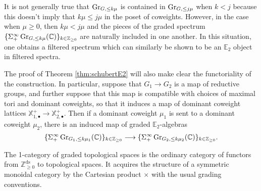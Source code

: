 \begin{rmk}
It is not generally true that $\operatorname{\mathrm{Gr}}_{G,\leq k\mu}$ is contained in $\operatorname{\mathrm{Gr}}_{G, \leq j\mu}$ when $k<j$ because this doesn't imply that $k\mu \leq j\mu$ in the poset of coweights.  However, in the case when $\mu \geq 0$, then $k\mu < j\mu$ and the pieces of the graded spectrum $ \{ \Sigma^{\infty}_+ \operatorname{\mathrm{Gr}}_{G,\leq k\mu}(\mathbb{C})\}_{k\in \mathbb{Z}_{\geq 0}}$ are naturally included in one another.  In this situation, one obtains a filtered spectrum which can similarly be shown to be an $\mathbb{E}_2$ object in filtered spectra.  
\end{rmk}


\begin{rmk} \label{rmk:bdgrfunct}

The proof of Theorem \ref{thm:schubertE2} will also make clear the functoriality of the construction.  In particular, suppose that $G_1 \longrightarrow G_2$ is a map of reductive groups, and further suppose that this map is compatible with choices of maximal tori and dominant coweights, so that it induces a map of dominant coweight lattices $\mathbb{X}_{1,\bullet}^+ \longrightarrow \mathbb{X}_{2,\bullet}^+$.  Then if a dominant coweight $\mu_1$ is sent to a dominant coweight $\mu_2$, there is an induced map of graded $\mathbb{E}_2$-algebras
$$\{\Sigma^{\infty}_+ \operatorname{\mathrm{Gr}}_{G_1, \leq k \mu_1}(\mathbb{C}) \}_{k\in \mathbb{Z}_{\geq 0}} \longrightarrow \{\Sigma^{\infty}_+ \operatorname{\mathrm{Gr}}_{G_2, \leq k \mu_2} (\mathbb{C}) \}_{k\in \mathbb{Z}_{\geq 0}}.$$
\end{rmk}

\begin{dfn}
The 1-category of graded topological spaces is the ordinary category of functors from $\mathbb{Z}_{\geq 0}^{\mathrm{ds}}$ to topological spaces.  It acquires the structure of a symmetric monoidal category by the Cartesian product $\times$ with the usual grading conventions.  
\end{dfn}

